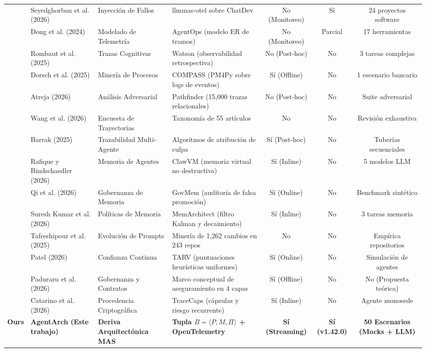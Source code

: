 \documentclass[conference]{IEEEtran}
\begin{document}
\begin{table}[t]
\begin{tabularx}{\textwidth}{lp{2.4cm}p{2.6cm}p{3.2cm}ccc}
\cite{seyedghorban2026} & Seyedghorban et al. (2026) & Inyecci\'on de Fallos & llmmas-otel sobre ChatDev & No (Monitoreo) & S\'i & 24 proyectos software \\
\cite{dong2024} & Dong et al. (2024) & Modelado de Telemetr\'ia & AgentOps (modelo ER de tramos) & No (Monitoreo) & Parcial & 17 herramientas \\
\cite{rombaut2025} & Rombaut et al. (2025) & Trazas Cognitivas & Watson (observabilidad retrospectiva) & No (Post-hoc) & No & 3 tareas complejas \\
\cite{dorsch2025} & Dorsch et al. (2025) & Miner\'ia de Procesos & COMPASS (PM4Py sobre logs de eventos) & S\'i (Offline) & No & 1 escenario bancario \\
\cite{atreja2026} & Atreja (2026) & An\'alisis Adversarial & Pathfinder (15,000 trazas relacionales) & No (Post-hoc) & No & Suite adversarial \\
\cite{wangj2026} & Wang et al. (2026) & Encuesta de Trayectorias & Taxonom\'ia de 55 art\'iculos & No & No & Revisi\'on exhaustiva \\
\cite{barrak2025} & Barrak (2025) & Trazabilidad Multi-Agente & Algoritmos de atribuci\'on de culpa & S\'i (Post-hoc) & No & Tuber\'ias secuenciales \\
\midrule
\cite{rafique2026} & Rafique y Bindschaedler (2026) & Memoria de Agentes & ClawVM (memoria virtual no destructiva) & S\'i (Inline) & No & 5 modelos LLM \\
\cite{qi2026} & Qi et al. (2026) & Gobernanza de Memoria & GovMem (auditor\'ia de falsa promoci\'on) & S\'i (Online) & No & Benchmark sint\'etico \\
\cite{sureshkumar2026} & Suresh Kumar et al. (2026) & Pol\'iticas de Memoria & MemArchitect (filtro Kalman y decaimiento) & S\'i (Inline) & No & 3 tareas memoria \\
\cite{tafreshipour2025} & Tafreshipour et al. (2025) & Evoluci\'on de Prompts & Miner\'ia de 1,262 cambios en 243 repos & No & No & Emp\'irica repositorios \\
\midrule
\cite{patel2026} & Patel (2026) & Confianza Continua & TARV (puntuaciones heur\'isticas uniformes) & S\'i (Online) & No & Simulaci\'on de agentes \\
\cite{paduraru2026} & Paduraru et al. (2026) & Gobernanza y Contratos & Marco conceptual de aseguramiento en 4 capas & S\'i (Offline) & No & No (Propuesta te\'orica) \\
\cite{catarino2026} & Catarino et al. (2026) & Procedencia Criptogr\'afica & TraceCaps (c\'apsulas y riesgo recurrente) & S\'i (Inline) & No & Agente monosede \\
\midrule
\textbf{Ours} & \textbf{AgentArch (Este trabajo)} & \textbf{Deriva Arquitect\'onica MAS} & \textbf{Tupla $B = \langle P, M, \Pi \rangle$ + OpenTelemetry} & \textbf{S\'i (Streaming)} & \textbf{S\'i (v1.42.0)} & \textbf{50 Escenarios (Mocks + LLM)} \\
\bottomrule
\end{tabularx}
\end{table}
\end{document}
